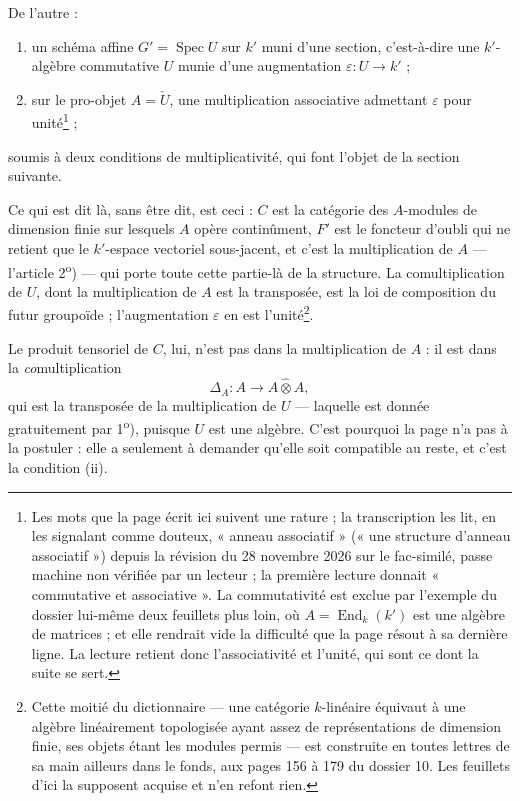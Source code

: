 \documentclass[11pt,a4paper]{article}
\begin{document}
De l'autre :

\begin{enumerate}
\item[1\textsuperscript{o})] un schéma affine $G' = \operatorname{Spec} U$ sur
$k'$ muni d'une section, c'est-à-dire une $k'$-algèbre commutative $U$ munie
d'une augmentation $\varepsilon : U \to k'$ ;
\item[2\textsuperscript{o})] sur le pro-objet $A = \check{U}$, une
multiplication associative admettant $\varepsilon$ pour
unité\footnote{Les mots que la page écrit ici suivent une rature ; la
transcription les lit, en les signalant comme douteux, « anneau associatif »
(« une structure d'anneau associatif ») depuis la révision du 28 novembre 2026 sur le fac-similé, passe machine non vérifiée par un lecteur ;
la première lecture donnait « commutative et associative ». La commutativité est exclue par l'exemple du dossier lui-même
deux feuillets plus loin, où $A = \operatorname{End}_{k}(k')$ est une algèbre
de matrices ; et elle rendrait vide la difficulté que la page résout à sa
dernière ligne. La lecture retient donc l'associativité et l'unité, qui sont
ce dont la suite se sert.} ;
\end{enumerate}

soumis à deux conditions de multiplicativité, qui font l'objet de la section
suivante.

Ce qui est dit là, sans être dit, est ceci : $C$ est la catégorie des
$A$-modules de dimension finie sur lesquels $A$ opère continûment, $F'$ est le
foncteur d'oubli qui ne retient que le $k'$-espace vectoriel sous-jacent, et
c'est la multiplication de $A$ — l'article 2\textsuperscript{o}) — qui porte
toute cette partie-là de la structure. La comultiplication de $U$, dont la
multiplication de $A$ est la transposée, est la loi de composition du futur
groupoïde ; l'augmentation $\varepsilon$ en est l'unité\footnote{Cette moitié
du dictionnaire — une catégorie $k$-linéaire équivaut à une algèbre
linéairement topologisée ayant assez de représentations de dimension finie, ses
objets étant les modules permis — est construite en toutes lettres de sa main
ailleurs dans le fonds, aux pages 156 à 179 du dossier 10. Les feuillets d'ici
la supposent acquise et n'en refont rien.}.

Le produit tensoriel de $C$, lui, n'est pas dans la multiplication de $A$ : il
est dans la \emph{co}multiplication
\[
\Delta_{A} : A \longrightarrow A \mathbin{\hat{\otimes}} A,
\]
qui est la transposée de la multiplication de $U$ — laquelle est donnée
gratuitement par 1\textsuperscript{o}), puisque $U$ est une algèbre. C'est
pourquoi la page n'a pas à la postuler : elle a seulement à demander qu'elle
soit compatible au reste, et c'est la condition (ii).
\end{document}
